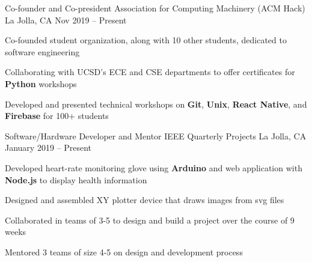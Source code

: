 \documentclass[]{awesome-cv}
\begin{document}
\vspace{-5mm}
\begin{cventries}
	\cventry
  {Co-founder and Co-president}
  {Association for Computing Machinery (ACM Hack)}
	{La Jolla, CA}
  {Nov 2019 – Present}
	{\begin{cvitems}
    \item {Co-founded student organization, along with 10 other students,
      dedicated to software engineering}
    \item {Collaborating with UCSD's ECE and CSE departments to offer certificates
      for \textbf{Python} workshops}
    \item {Developed and presented technical workshops on \textbf{Git}, \textbf{Unix},
        \textbf{React Native}, and \textbf{Firebase} for 100+ students}
		\end{cvitems}}

	\vspace{-3mm}
	\cventry
  {Software/Hardware Developer and  Mentor}
	{IEEE Quarterly Projects}
	{La Jolla, CA}
  {January 2019 – Present}
	{\begin{cvitems}
    \item {Developed heart-rate monitoring glove using \textbf{Arduino} and
      web application with \textbf{Node.js} to display health information}
    \item {Designed and assembled XY plotter device that draws images from svg
      files}
    \item {Collaborated in teams of 3-5 to design and build a project over the
      course of 9 weeks}
    \item {Mentored 3 teams of size 4-5 on design and development process}
		\end{cvitems}}



\end{cventries}
\end{document}
